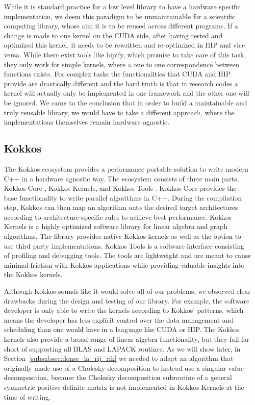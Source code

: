 \documentclass{article}
\begin{document}
While it is standard practice for a low level library to have a
hardware specific implementation, we deem this paradigm to be
unmaintainable for a scientific computing library, whose aim it is
to be reused across different programs. If a change is made to one
kernel on the CUDA side, after having tested and optimized this
kernel, it needs to be rewritten and re-optimized in HIP and
vice versa. While there exist tools like hipify, which promise to
take care of this task, they only work for simple kernels,
where a one to one correspondence between functions exists. For
complex tasks the functionalities that CUDA and HIP provide are
drastically different and the hard truth is that in research codes a
kernel will actually only be implemented in one framework and the
other one will be ignored. We came to the conclusion that in order to build a
maintainable and truly reusable library, we would have to take a
different approach, where the implementations themselves remain
hardware agnostic.

\subsection{Kokkos}\label{subsec:Kokkos}

The Kokkos ecosystem provides a performance portable solution to
write modern C++ in a hardware agnostic way. The ecosystem consists
of three main parts, Kokkos Core \cite{CarterEdwards2014, Trott2022},
Kokkos Kernels, \cite{Rajamanickam2021} and Kokkos Tools
\cite{Hammond2018}. Kokkos Core provides the base functionality to
write parallel algorithms in C++. During the compilation step, Kokkos
can then map an algorithm onto the desired target architectures
according to architecture-specific rules to achieve best performance.
Kokkos Kernels is a highly optimized software library for linear
algebra and graph algorithms. The library provides native Kokkos
kernels as well as the option to use third party implementations.
Kokkos Tools is a software interface consisting of profiling and
debugging tools. The tools are lightweight and are meant to
cause minimal friction with Kokkos applications while providing
valuable insights into the Kokkos kernels.

Although Kokkos sounds like it would solve all of our problems, we
observed clear drawbacks during the design and testing of our
library. For example, the software developer is only able to write the
kernels according to Kokkos' patterns, which means the developer has
less explicit control over the data management and scheduling than
one would have in a language like CUDA or HIP. The Kokkos kernels also
provide a broad range of linear algebra functionality, but they fall
far short of supporting all BLAS and LAPACK routines. As we will
show later, in Section~\ref{subsubsec:dense_la_rij_rik} we needed to adapt an
algorithm that originally made use of a Cholesky decomposition to
instead use a singular value decomposition, because the Cholesky
decomposition subroutine of a general symmetric positive definite
matrix is not implemented in Kokkos Kernels at the time of writing.
\end{document}
